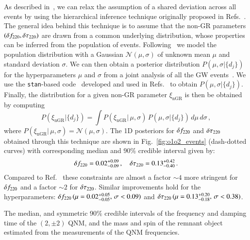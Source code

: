 As described in~\cite{Abbott:2020jks}, we can relax the assumption of a shared deviation across all events by using the hierarchical inference technique originally proposed in Refs.~\cite{Zimmerman:2019wzo,Isi:2019asy}. The general idea behind this technique is to assume that the non-GR parameters $(\delta f_{\text{220}},\delta \tau_{\text{220}})$ are drawn from a common underlying distribution, whose properties can be inferred from the population of events. Following~\cite{Zimmerman:2019wzo,Isi:2019asy,Abbott:2020jks} we model the population distribution with a Gaussian  $\mathcal{N}(\mu,\sigma)$ of unknown mean $\mu$ and standard deviation $\sigma$. We can then obtain a posterior distribution $P(\mu, \sigma |  \{d_j\}) $ for the hyperparameters $\mu$ and $\sigma$ from a joint analysis of all the GW events~\cite{Isi:2019asy}. We use the \texttt{stan}-based code~\cite{stan} developed and used in Refs.~\cite{Isi:2019asy,Abbott:2020jks} to obtain $P(\mu, \sigma |  \{d_j\}) $.
%
Finally, the distribution for a given non-GR parameter $\xi_{\text{nGR}}$ is then be obtained by computing~\cite{Isi:2019asy}
%
\begin{equation}
P(\xi_{\text{nGR}} | \{d_j\}) = \int P(\xi_{\text{nGR}} |\, \mu, \sigma)\,P(\mu, \sigma |  \{d_j\})\,d\mu\,d\sigma \,,
\end{equation}
%
where $P(\xi_{\text{nGR}} | \,\mu, \sigma) = \mathcal{N}(\mu,\sigma)$. The 1D posteriors for $\delta f_{\text{220}}$ and $ \delta \tau_{\text{220}}$ obtained through this technique are shown in Fig.~\ref{fig:o1o2_events} (dash-dotted curves) with corresponding median and 90\% credible interval given by: 
%
\begin{equation}
\delta f_{\text{220}}=0.02^{+0.09}_{-0.09}\,,\quad \delta \tau_{\text{220}}=0.13^{+0.42}_{-0.40}\,.
\end{equation}
Compared to Ref.~\cite{Abbott:2020jks} these constraints are almost a factor $\sim 4$ more stringent for $\delta f_{\text{220}}$ and a factor $\sim 2$ for $\delta \tau_{\text{220}}$. Similar improvements hold for the hyperparameters: $\delta f_{\text{220}}\,(\mu=0.02^{+0.05}_{-0.05},\,\sigma<0.09)$ and $\delta \tau_{\text{220}}\,(\mu=0.13^{+0.20}_{-0.18},\,\sigma<0.38)$.


\begin{table}

\caption{The median, and symmetric 90\% credible intervals of the frequency and damping time of the $(2,\pm2)$ QNM, and the mass and spin of the remnant object estimated from the measurements of the QNM frequencies.}
\label{tab:qnm_o1o2_results}
\end{table}

